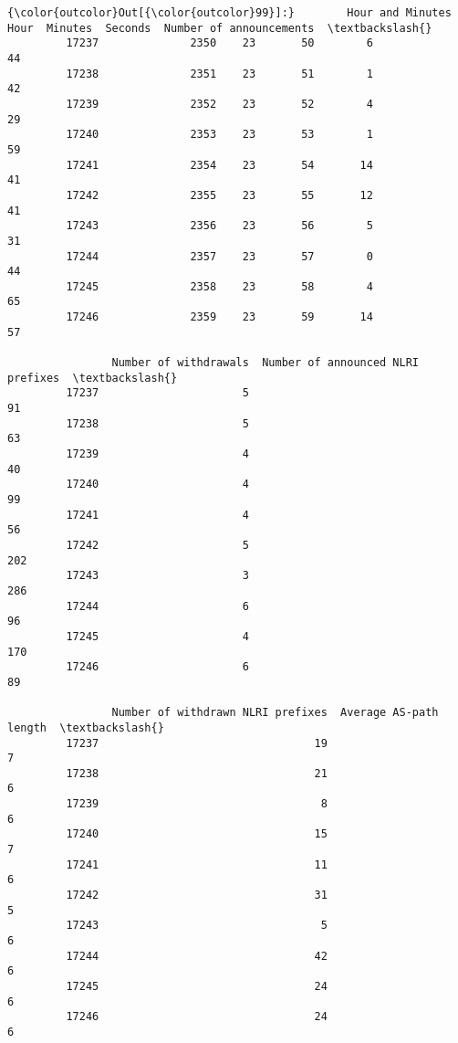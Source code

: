 \documentclass[11pt]{article}
\begin{document}
\begin{Verbatim}[commandchars=\\\{\}]
{\color{outcolor}Out[{\color{outcolor}99}]:}        Hour and Minutes  Hour  Minutes  Seconds  Number of announcements  \textbackslash{}
         17237              2350    23       50        6                       44   
         17238              2351    23       51        1                       42   
         17239              2352    23       52        4                       29   
         17240              2353    23       53        1                       59   
         17241              2354    23       54       14                       41   
         17242              2355    23       55       12                       41   
         17243              2356    23       56        5                       31   
         17244              2357    23       57        0                       44   
         17245              2358    23       58        4                       65   
         17246              2359    23       59       14                       57   
         
                Number of withdrawals  Number of announced NLRI prefixes  \textbackslash{}
         17237                      5                                 91   
         17238                      5                                 63   
         17239                      4                                 40   
         17240                      4                                 99   
         17241                      4                                 56   
         17242                      5                                202   
         17243                      3                                286   
         17244                      6                                 96   
         17245                      4                                170   
         17246                      6                                 89   
         
                Number of withdrawn NLRI prefixes  Average AS-path length  \textbackslash{}
         17237                                 19                       7   
         17238                                 21                       6   
         17239                                  8                       6   
         17240                                 15                       7   
         17241                                 11                       6   
         17242                                 31                       5   
         17243                                  5                       6   
         17244                                 42                       6   
         17245                                 24                       6   
         17246                                 24                       6   
         

\end{Verbatim}
\end{document}
